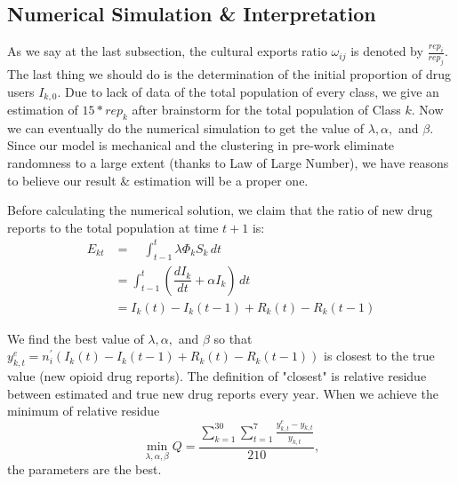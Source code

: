 \documentclass{mcmthesis}
\begin{document}
\subsection{Numerical Simulation \& Interpretation}

As we say at the last subsection, the cultural exports ratio $\omega_{ij}$ is denoted by $\frac{rep_i}{rep_j}$. The last thing we should do is the determination of the initial proportion of drug users $I_{k,0}$. Due to lack of data of the total population of every class, we give an estimation of $15*rep_k$ after brainstorm for the total population of Class $k$. Now we can eventually do the numerical simulation to get the value of $\lambda,\alpha,$ and $\beta$. Since our model is mechanical and the clustering in pre-work eliminate randomness to a large extent (thanks to Law of Large Number), we have reasons to believe our result \& estimation will be a proper one.

Before calculating the numerical solution, we claim that the ratio of new drug reports to the total population at time $t+1$ is:
\begin{equation}
 	\begin{aligned}
 		E_{kt}&=\quad \int_{t-1}^{t} \lambda \Phi_k S_k\, dt\\
 		&=\int_{t-1}^{t} (\dfrac{dI_k}{dt}+\alpha I_k)\, dt\\
 		&=I_k(t)-I_k(t-1)+R_k(t)-R_k(t-1)
 	\end{aligned}
 \end{equation}

We find the best value of $\lambda,\alpha,$ and $\beta$ so that $y^e_{k,t}=n^{'}_{i}(I_k(t)-I_k(t-1)+R_k(t)-R_k(t-1))$ is closest to the true value (new opioid drug reports). The definition of "closest" is relative residue between estimated and true new drug reports every year. When we achieve the minimum of relative residue 
$$\min \limits_{\lambda, \alpha, \beta} Q=\dfrac{\sum_{k=1}^{30}\sum_{t=1}^{7}\frac{y^e_{k,t}-y_{k,t}}{y_{k,t}}}{210},$$
the parameters are the best.
\end{document}
